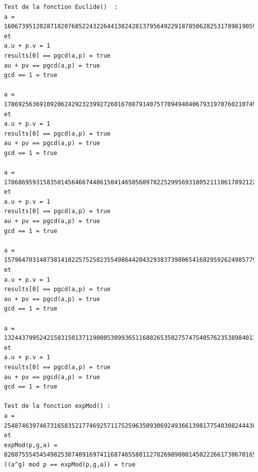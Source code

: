 \documentclass[a4paper,11pt]{article}
\begin{document}
\begin{lstlisting}[caption ={le fichier test.txt}, captionpos=b,breaklines = true]
Test de la fonction Euclide()  : 
a = 160673951202871820768522432264413824281379564922918785062825317898190593802109840755896761432932396921370717923680995368632651713753124593343418110386158594003109874457006794327810034901124362304868722224106716023601094727602631269317995249471403818877294271903566082226945015280819860534613810788669181142655 et
a.u + p.v = 1
results[0] == pgcd(a,p) = true
au + pv == pgcd(a,p) = true
gcd == 1 = true

a = 178692563691092062429232399272601670879140757709494040679319707602107499034757832117396622593819258118576208765751340049391086793819262707001263576304316965882916898524551880613703248267995736142789373890193765303933296483895225177716470098681267538381459571544678597351156562100160694233453703372198074925403 et 
a.u + p.v = 1
results[0] == pgcd(a,p) = true
au + pv == pgcd(a,p) = true
gcd == 1 = true

a = 178686959315835014564667448615041465056097822529956931805211106178921228239734109306721901497944637150575015899831448974892426985045808388703911684127372064587777485170648551837829545664940655151294550883657639048804958903374346976533090451645223528400958169203505829829473353815946210930698647261455270391978 et 
a.u + p.v = 1
results[0] == pgcd(a,p) = true
au + pv == pgcd(a,p) = true
gcd == 1 = true

a = 157964703148738141022575258235549864420432938373980654168295926249857798008255841642664404511207317166809777481697855997641388257161389902718534687620438268328893365738747403425492858594821889372685442418247611565157649550720632350481246844976845544125093251202712563018590019711332515298045258381423755311035 et 
a.u + p.v = 1
results[0] == pgcd(a,p) = true
au + pv == pgcd(a,p) = true
gcd == 1 = true

a = 132443799524215031501371190805309936511680265350275747540576235389840115523197368498347159308049620414822493485803422301906672653540803409802815944586910094455036396838045194706531559689821839601926836916226585504092800490455737561985281816791220438384614938447890176935510898070270806063376989730577414055179 et 
a.u + p.v = 1
results[0] == pgcd(a,p) = true
au + pv == pgcd(a,p) = true
gcd == 1 = true

Test de la fonction expMod() : 
a = 2548746397467316583521774692571175259635093069249366139817754030824443844383001006506780444082873915693407959776391867717161434678916643293256961828108 et 
expMod(p,g,a) = 8208755545454982530740916974116874655801127826989080145022266173067016516715817182174983183046473236864507043906801872058607908715503970307818477686703256748973957318540034983385303471678010146813073887016566115889074803406252798744886788720503484780554707969305456866240224561325426273798016633176640553319
((a^g) mod p == expMod(p,g,a)) = true


\end{lstlisting}
\end{document}
